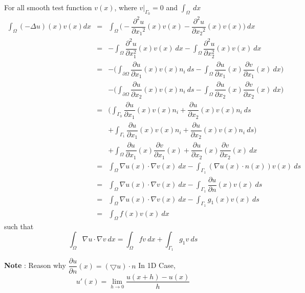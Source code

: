 \documentclass[a4paper,10pt]{article}
\begin{document}
For all smooth test function $ v(x) $, where $ v|_{\Gamma_{0}}=0 $ and $ \int_{\Omega} \ dx $
\begin{eqnarray} \nonumber
 \int_\Omega (-\Delta u)(x) v(x) dx &=&\int_\Omega \Big(-\dfrac{\partial^2u}{\partial{x_1}^2} (x) v(x) -\dfrac{\partial^2u}{\partial{x_2}^2} (x) v(x) \Big) \ dx \\ \nonumber
&=& - \int_{\Omega} \dfrac{\partial^{2}u}{\partial x_{1}^{2}}  (x) v(x) \ dx - \int_{\Omega} \dfrac{\partial^{2} u}{\partial x_{2}^{2}} (x) v(x) \ dx\\ \nonumber
&=& - \Big( \int_{\partial \Omega} \dfrac{\partial u}{\partial x_{1}} (x) v(x) n_{i} \ ds - \int_{\Omega} \dfrac{\partial u}{\partial x_{1}} (x) \dfrac{\partial v}{\partial x_{1}} (x) \ dx \Big) \\ \nonumber
&& - \Big( \int_{\partial \Omega} \dfrac{\partial u}{\partial x_{2}} (x) v(x) n_{i} \ ds - \int_{\Omega} \dfrac{\partial u}{\partial x_{2}} (x) \dfrac{\partial v}{\partial x_{2}} (x) \ dx \Big) \\ \nonumber
&=& \Big( \int_{\Gamma_0} \dfrac{\partial u}{\partial x_{1}} (x) v(x) n_{i} + \dfrac{\partial u}{\partial x_{2}} (x) v(x) n_{i} \ ds \\ \nonumber
&& + \int_{\Gamma_1} \dfrac{\partial u}{\partial x_{1}} (x) v(x) n_{i} + \dfrac{\partial u}{\partial x_{2}} (x) v(x) n_{i} \ ds \Big) \\ \nonumber
&& + \int_{\Omega} \dfrac{\partial u}{\partial x_{1}} (x) \dfrac{\partial v}{\partial x_{1}} (x) + \dfrac{\partial u}{\partial x_{2}} (x) \dfrac{\partial v}{\partial x_{2}} (x) \ dx \\ \nonumber
&=& \int_{\Omega} \nabla u(x) \cdot \nabla v(x) \ dx - \int_{\Gamma_1} (\nabla u(x) \cdot n(x)) v(x) \ ds \\ \nonumber
&=& \int_{\Omega} \nabla u(x) \cdot \nabla v(x) \ dx - \int_{\Gamma_1} \dfrac{\partial u}{\partial n} (x) v(x) \ ds \\ \nonumber
&=& \int_{\Omega} \nabla u(x) \cdot \nabla v(x) \ dx - \int_{\Gamma_1} g_{1}(x) v(x) \ ds\\ \nonumber
&=& \int_{\Omega} f(x) v(x) \ dx
\end{eqnarray}
such that  
\begin{equation*}
\int_{\Omega} \nabla u \cdot \nabla v \ dx = \int_{\Omega} f v \ dx + \int_{\Gamma_1} g_{1} v \ ds
\end{equation*} 


\textbf{Note} : Reason why $ \dfrac{\partial u}{\partial n} (x) = (\bigtriangledown u ) \cdot n $
In 1D Case,
\begin{equation*}
u'(x) = \lim\limits_{h\rightarrow 0} \dfrac{u(x+h)-u(x)}{h}
\end{equation*}
\end{document}
